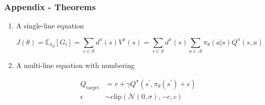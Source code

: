 \begin{frame}[noframenumbering]
\label{Theorems}
	\frametitle{Appendix - Theorems}
    \begin{enumerate}
        \item A single-line equation \newline
        
        \begin{equation*}
            J(\theta) = \mathbb{E}_{\pi_\theta}[G_t] = \sum_{s\in\mathcal{S}} d^\pi (s)V^\pi(s)=\sum_{s\in\mathcal{S}} d^\pi(s)\sum_{a\in\mathcal{A}}\pi_\theta(a|s)Q^\pi(s,a)
        \end{equation*}

        \item A multi-line equation with numbering \newline
        
        \begin{align}
            Q_\mathrm{target}&=r+\gamma Q^\pi(s^\prime, \pi_\theta(s^\prime)+\epsilon)\\
            \epsilon&\sim\mathrm{clip}(\mathcal{N}(0, \sigma), -c, c)\nonumber
        \end{align}
    \end{enumerate}

    \hyperlink{Maths}{}
\end{frame}